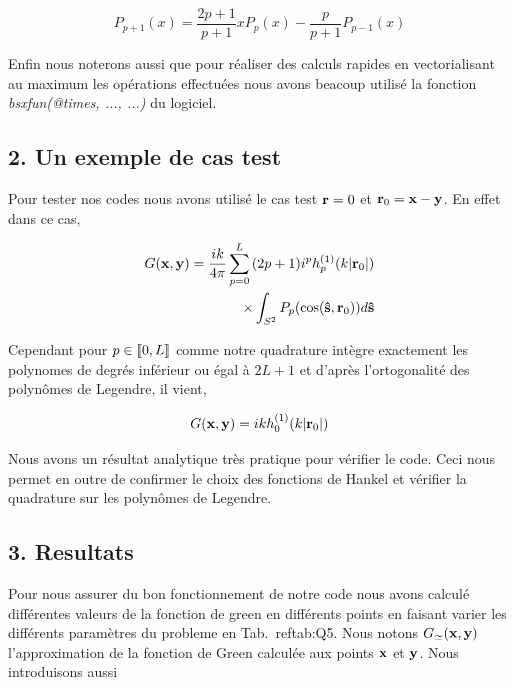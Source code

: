 \documentclass[10pt]{article}
\begin{document}
\begin{multicols}{2}
\begin{equation}
	P_{p+1}(x) =  \frac{2p+1}{p+1}xP_{p}(x) - \frac{p}{p+1}P_{p-1}(x) 
\end{equation}


Enfin nous noterons aussi que pour réaliser des calculs rapides en vectorialisant au maximum les opérations effectuées nous avons beacoup utilisé la fonction \textit{bsxfun(@times, ..., ...)} du logiciel.





\vspace*{10pt}


\subsection*{2. Un exemple de cas test}

Pour tester nos codes nous avons utilisé le cas test ${\bf r} = 0$ et ${\bf r}_0 = {\bf x} - {\bf y}$. En effet dans ce cas,

\begin{equation}
\begin{split}
G({\bf x},{\bf y}) = \frac{ik}{4\pi}\sum_{p=0}^{L}{} (2p+1)i^{p}h_p^{(1)}(k|{\bf r}_0|)  \\
 \times\int_{S^{2}}P_p(\cos({\bf \hat{s}}, {\bf r}_0))d{\bf \hat{s}} 
\end{split}
\end{equation}

Cependant pour $p\in \llbracket 0,L \rrbracket $ comme notre quadrature intègre exactement les polynomes de degrés inférieur ou égal à $2L+1$ et d'après l'ortogonalité des polynômes de Legendre, il vient, 

\begin{equation}
G({\bf x},{\bf y}) = ikh^{(1)}_{0}(k|{\bf r}_0|)
\end{equation}

Nous avons un résultat analytique très pratique pour vérifier le code. Ceci nous permet en outre de confirmer le choix des fonctions de Hankel et vérifier la quadrature sur les polynômes de Legendre. 



\vspace*{10pt}

\subsection*{3. Resultats}

Pour nous assurer du bon fonctionnement de notre code nous avons calculé différentes valeurs de la fonction de green en différents points en faisant varier les différents paramètres du probleme en Tab.~ref{tab:Q5}. Nous notons $G_{\simeq}({\bf x}, {\bf y})$ l'approximation de la fonction de Green calculée aux points ${\bf x}$ et ${\bf y}$.  Nous introduisons aussi 



\end{multicols}
\end{document}
